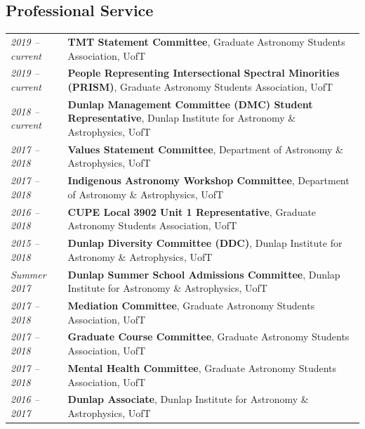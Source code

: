 \documentclass[10pt]{res} %
\begin{document}
\begin{resume}

\section{\Large Professional Service}
\vspace{-5pt} %
\noindent\makebox[\linewidth]{\rule{\textwidth}{0.4pt}}
\vspace{-20pt} %

\begin{table}[h]
\begin{tabularx}{\textwidth}{lX}
\textit{2019 -- current} & \textbf{TMT Statement Committee}, Graduate Astronomy Students Association, UofT \\
\textit{2019 -- current} & \textbf{People Representing Intersectional Spectral Minorities (PRISM)}, Graduate Astronomy Students Association, UofT \\
\textit{2018 -- current} & \textbf{Dunlap Management Committee (DMC) Student Representative}, Dunlap Institute for Astronomy \& Astrophysics, UofT \\
\textit{2017 -- 2018} & \textbf{Values Statement Committee}, Department of Astronomy \& Astrophysics, UofT \\
\textit{2017 -- 2018} & \textbf{Indigenous Astronomy  Workshop Committee}, Department of Astronomy \& Astrophysics, UofT \\
\textit{2016 --  2018} & \textbf{CUPE Local 3902 Unit 1 Representative}, Graduate Astronomy Students Association, UofT \\
\textit{2015 --  2018} & \textbf{Dunlap Diversity Committee (DDC)}, Dunlap Institute for Astronomy \& Astrophysics, UofT \\
\textit{Summer 2017} & \textbf{Dunlap Summer School Admissions Committee}, Dunlap Institute for Astronomy \& Astrophysics, UofT \\
\textit{2017 -- 2018} & \textbf{Mediation Committee}, Graduate Astronomy Students Association, UofT \\
\textit{2017 -- 2018} & \textbf{Graduate Course Committee}, Graduate Astronomy Students Association, UofT \\
\textit{2017 -- 2018} & \textbf{Mental Health Committee}, Graduate Astronomy Students Association, UofT \\
\textit{2016 --  2017} & \textbf{Dunlap Associate}, Dunlap Institute for Astronomy \& Astrophysics, UofT
\end{tabularx}
\end{table}


\end{resume}
\end{document}
